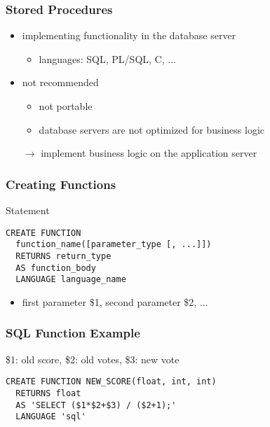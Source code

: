 \documentclass[dvipsnames]{beamer}
\theoremstyle{plain}
\begin{document}
\begin{frame}
  \frametitle{Stored Procedures}

  \begin{itemize}
    \item implementing functionality in the database server
    \begin{itemize}
      \item languages: SQL, PL/SQL, C, ...
    \end{itemize}

    \pause
    \bigskip
    \item \alert{not recommended}
    \begin{itemize}
      \item not portable
      \item database servers are not optimized for business logic
    \end{itemize}
    $\rightarrow$ implement business logic on the application server
  \end{itemize}
\end{frame}

\begin{frame}[fragile]
  \frametitle{Creating Functions}

  \begin{block}{Statement}
    \begin{lstlisting}[language=ExtendedSQL]
CREATE FUNCTION
  function_name([parameter_type [, ...]])
  RETURNS return_type
  AS function_body
  LANGUAGE language_name
    \end{lstlisting}
  \end{block}

  \pause
  \begin{itemize}
    \item first parameter \$1, second parameter \$2, ...
  \end{itemize}
\end{frame}

\begin{frame}[fragile]
  \frametitle{SQL Function Example}

  \begin{example}
    \$1: old score, \$2: old votes, \$3: new vote
    \begin{lstlisting}[language=ExtendedSQL]
CREATE FUNCTION NEW_SCORE(float, int, int)
  RETURNS float
  AS 'SELECT ($1*$2+$3) / ($2+1);'
  LANGUAGE 'sql'
    \end{lstlisting}
  \end{example}
\end{frame}
\end{document}
